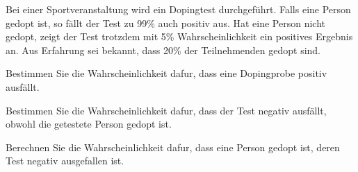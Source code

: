 \begin{Problem}
	Bei einer Sportveranstaltung wird ein Dopingtest durchgeführt. Falls eine Person gedopt ist, so fällt der Test zu 99\% auch positiv aus. Hat eine Person nicht gedopt, zeigt der Test trotzdem mit 5\% Wahrscheinlichkeit ein positives Ergebnis an. Aus Erfahrung sei bekannt, dass 20\% der Teilnehmenden gedopt sind.
	\begin{parts}
		\item Bestimmen Sie die Wahrscheinlichkeit dafur, dass eine Dopingprobe positiv ausf\"{a}llt.
		\item Bestimmen Sie die Wahrscheinlichkeit dafur, dass der Test negativ ausf\"{a}llt, obwohl die getestete Person gedopt ist.
		\item Berechnen Sie die Wahrscheinlichkeit dafur, dass eine Person gedopt ist, deren Test negativ ausgefallen ist.
	\end{parts}
\end{Problem}

